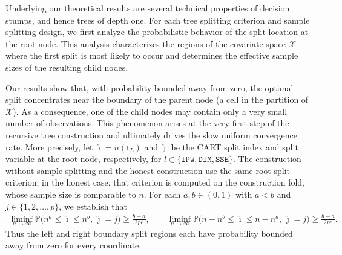 \documentclass[10pt]{article}
\def\nodet{\mathsf{t}}
\theoremstyle{definition}
\theoremstyle{remark}
\begin{document}
Underlying our theoretical results are several technical properties of decision stumps, and hence trees of depth one. For each tree splitting criterion and sample splitting design, we first analyze the probabilistic behavior of the split location at the root node. This analysis characterizes the regions of the covariate space $\mathcal{X}$ where the first split is most likely to occur and determines the effective sample sizes of the resulting child nodes.

Our results show that, with probability bounded away from zero, the optimal split concentrates near the boundary of the parent node (a cell in the partition of $\mathcal{X}$). As a consequence, one of the child nodes may contain only a very small number of observations. This phenomenon arises at the very first step of the recursive tree construction and ultimately drives the slow uniform convergence rate. More precisely, let $\hat{\imath} = n(\nodet_L)$ and $\hat{\jmath}$ be the CART split index and split variable at the root node, respectively, for $l \in \{\mathtt{IPW},\mathtt{DIM},\mathtt{SSE}\}$. The construction without sample splitting and the honest construction use the same root split criterion; in the honest case, that criterion is computed on the construction fold, whose sample size is comparable to $n$. For each $ a,b \in (0, 1) $ with $ a < b $ and $j \in \{1, 2, \dots, p\}$, we establish that
\begin{align}\label{sa-eq:causal-split-range}
     \liminf_{n\to\infty} \mathbb{P}\big( n^{a} \leq \hat{\imath} \leq n^{b},\, \hat{\jmath} = j \big) \geq \frac{b-a}{2pe},
     \qquad
     \liminf_{n\to\infty} \mathbb{P}\big( n-n^{b} \leq \hat{\imath} \leq n-n^{a},\, \hat{\jmath} = j \big) \geq \frac{b-a}{2pe}.
\end{align}
Thus the left and right boundary split regions each have probability bounded away from zero for every coordinate.
\end{document}
